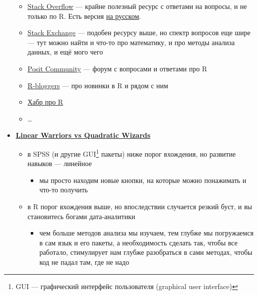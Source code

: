 \documentclass[
  letterpaper,
  DIV=11,
  numbers=noendperiod]{scrreprt}
\providecommand{\tightlist}{%
  \setlength{\itemsep}{0pt}\setlength{\parskip}{0pt}}\usepackage{longtable,booktabs,array}
\theoremstyle{definition}
\theoremstyle{remark}
\begin{document}
\begin{itemize}
  \begin{itemize}
  \tightlist
  \item
    \href{https://stackoverflow.com/}{Stack Overflow} --- крайне
    полезный ресурс с ответами на вопросы, и не только по R. Есть версия
    \href{https://ru.stackoverflow.com/}{на русском}.
  \item
    \href{https://stackexchange.com/}{Stack Exchange} --- подобен
    ресурсу выше, но спектр вопросов еще шире --- тут можно найти и
    что-то про математику, и про методы анализа данных, и ещё мого чего
  \item
    \href{https://community.rstudio.com/}{Posit Community} --- форум с
    вопросами и ответами про R
  \item
    \href{https://www.r-bloggers.com/}{R-bloggers} --- про новинки в R и
    рядом с ним
  \item
    \href{https://habr.com/ru/hub/r/}{Хабр про R}
  \item
    \ldots{}
  \end{itemize}
\item
  \href{https://1d4chan.org/wiki/Linear_Warriors,_Quadratic_Wizards}{\textbf{Linear
  Warriors vs Quadratic Wizards}}

  \begin{itemize}
  \tightlist
  \item
    в SPSS (и другие GUI\footnote{GUI --- графический интерфейс
      пользователя (graphical user interface)} пакеты) ниже порог
    вхождения, но развитие навыков --- линейное

    \begin{itemize}
    \tightlist
    \item
      мы просто находим новые кнопки, на которые можно понажимать и
      что-то получить
    \end{itemize}
  \item
    в R порог вхождения выше, но впоследствии случается резкий буст, и
    вы становитесь богами дата-аналитики

    \begin{itemize}
    \tightlist
    \item
      чем больше методов анализа мы изучаем, тем глубже мы погружаемся в
      сам язык и его пакеты, а необходимость сделать так, чтобы все
      работало, стимулирует нам глубже разобраться в сами методах, чтобы
      код не падал там, где не надо
    \end{itemize}
  \end{itemize}
\end{itemize}
\end{document}

